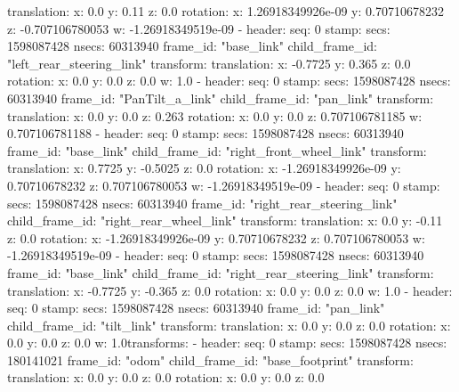       translation: 
        x: 0.0
        y: 0.11
        z: 0.0
      rotation: 
        x: 1.26918349926e-09
        y: 0.70710678232
        z: -0.707106780053
        w: -1.26918349519e-09
  - 
    header: 
      seq: 0
      stamp: 
        secs: 1598087428
        nsecs:  60313940
      frame_id: "base_link"
    child_frame_id: "left_rear_steering_link"
    transform: 
      translation: 
        x: -0.7725
        y: 0.365
        z: 0.0
      rotation: 
        x: 0.0
        y: 0.0
        z: 0.0
        w: 1.0
  - 
    header: 
      seq: 0
      stamp: 
        secs: 1598087428
        nsecs:  60313940
      frame_id: "PanTilt_a_link"
    child_frame_id: "pan_link"
    transform: 
      translation: 
        x: 0.0
        y: 0.0
        z: 0.263
      rotation: 
        x: 0.0
        y: 0.0
        z: 0.707106781185
        w: 0.707106781188
  - 
    header: 
      seq: 0
      stamp: 
        secs: 1598087428
        nsecs:  60313940
      frame_id: "base_link"
    child_frame_id: "right_front_wheel_link"
    transform: 
      translation: 
        x: 0.7725
        y: -0.5025
        z: 0.0
      rotation: 
        x: -1.26918349926e-09
        y: 0.70710678232
        z: 0.707106780053
        w: -1.26918349519e-09
  - 
    header: 
      seq: 0
      stamp: 
        secs: 1598087428
        nsecs:  60313940
      frame_id: "right_rear_steering_link"
    child_frame_id: "right_rear_wheel_link"
    transform: 
      translation: 
        x: 0.0
        y: -0.11
        z: 0.0
      rotation: 
        x: -1.26918349926e-09
        y: 0.70710678232
        z: 0.707106780053
        w: -1.26918349519e-09
  - 
    header: 
      seq: 0
      stamp: 
        secs: 1598087428
        nsecs:  60313940
      frame_id: "base_link"
    child_frame_id: "right_rear_steering_link"
    transform: 
      translation: 
        x: -0.7725
        y: -0.365
        z: 0.0
      rotation: 
        x: 0.0
        y: 0.0
        z: 0.0
        w: 1.0
  - 
    header: 
      seq: 0
      stamp: 
        secs: 1598087428
        nsecs:  60313940
      frame_id: "pan_link"
    child_frame_id: "tilt_link"
    transform: 
      translation: 
        x: 0.0
        y: 0.0
        z: 0.0
      rotation: 
        x: 0.0
        y: 0.0
        z: 0.0
        w: 1.0transforms: 
  - 
    header: 
      seq: 0
      stamp: 
        secs: 1598087428
        nsecs: 180141021
      frame_id: "odom"
    child_frame_id: "base_footprint"
    transform: 
      translation: 
        x: 0.0
        y: 0.0
        z: 0.0
      rotation: 
        x: 0.0
        y: 0.0
        z: 0.0
